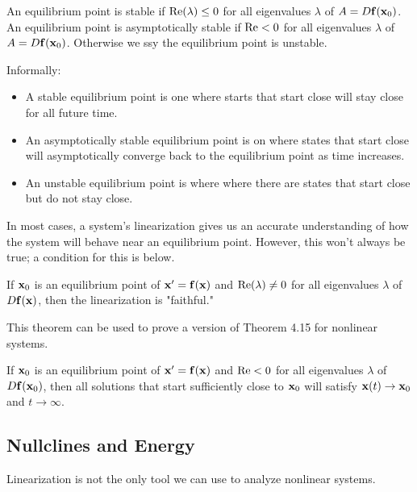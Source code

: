 \documentclass[../m082main.tex]{subfiles}
\begin{document}
\begin{definition}
    An equilibrium point is stable if $\textrm{Re} (\lambda) \leq 0$ for all eigenvalues $\lambda$ of $A = D \mathbf{f} (\mathbf{x}_0)$.
    An equilibrium point is asymptotically stable if $\textrm{Re} < 0$ for all eigenvalues $\lambda$ of $A = D \mathbf{f} (\mathbf{x}_0)$.
    Otherwise we ssy the equilibrium point is unstable.
\end{definition}

Informally:
\begin{itemize}
    \item A stable equilibrium point is one where starts that start close will stay close for all future time.
    \item An asymptotically stable equilibrium point is on where states that start close will asymptotically converge back to the equilibrium point as time increases.
    \item An unstable equilibrium point is where where there are states that start close but do not stay close.
\end{itemize}
In most cases, a system's linearization gives us an accurate understanding of how the system will behave near an equilibrium point.
However, this won't always be true; a condition for this is below.

\begin{theorem}
    If $\mathbf{x}_0$ is an equilibrium point of $\mathbf{x}'= \mathbf{f}(\mathbf{x})$ and $\textrm{Re} (\lambda) \neq 0$ for all eigenvalues $\lambda$ of $D \mathbf{f} (\mathbf{x})$, then the linearization is "faithful."
\end{theorem}

This theorem can be used to prove a version of Theorem 4.15 for nonlinear systems.

\begin{theorem}
    If $\mathbf{x}_0$ is an equilibrium point of $\mathbf{x}' = \mathbf{f} (\mathbf{x})$ and $\textrm{Re} < 0$ for all eigenvalues $\lambda$ of $D \mathbf{f} (\mathbf{x}_0)$, then all solutions that start sufficiently close to $\mathbf{x}_0$ will satisfy $\mathbf{x}(t) \to \mathbf{x}_0$ and $t \to \infty$.
\end{theorem}

\subsection{Nullclines and Energy}
Linearization is not the only tool we can use to analyze nonlinear systems.
\end{document}
